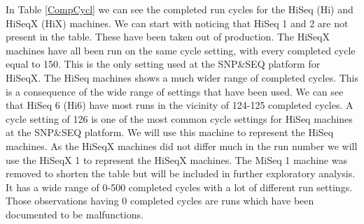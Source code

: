 \documentclass[a4paper,11pt,fleqn,twoside,notitlepage]{report}
\begin{document}
In Table \ref{CompCycl} we can see the completed run cycles for the HiSeq (Hi) and HiSeqX (HiX) machines. We can start with noticing that HiSeq 1 and 2 are not present in the table. These have been taken out of production. The HiSeqX machines have all been run on the same cycle setting, with every completed cycle equal to 150. This is the only setting used at the SNP\&SEQ platform for HiSeqX. The HiSeq machines shows a much wider range of completed cycles. This is a consequence of the wide range of settings that have been used. We can see that HiSeq 6 (Hi6) have most runs in the vicinity of 124-125 completed cycles. A cycle setting of 126 is one of the most common cycle settings for HiSeq machines at the SNP\&SEQ platform. We will use this machine to represent the HiSeq machines. As the HiSeqX machines did not differ much in the run number we will use the HiSeqX 1 to represent the HiSeqX machines. The MiSeq 1 machine was removed to shorten the table but will be included in further exploratory analysis. It has a wide range of 0-500 completed cycles with a lot of different run settings. Those observations having 0 completed cycles are runs which have been documented to be malfunctions.
\end{document}
